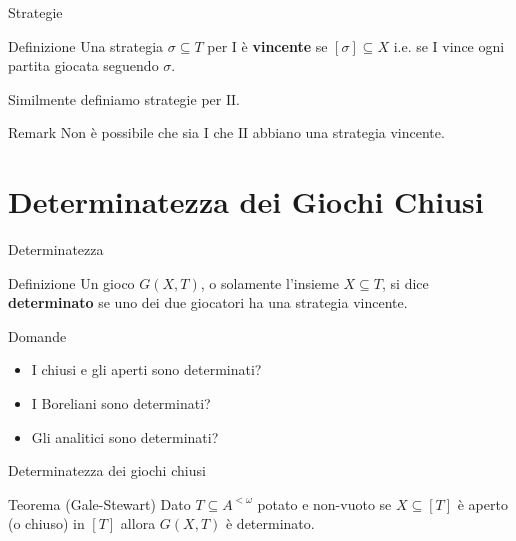 \documentclass[aspectratio=43]{beamer}
\begin{document}
\begin{frame}{Strategie}
  \begin{block}{Definizione}
    Una strategia \(\sigma \subseteq T\) per \(\mathrm{I}\) è \textbf{vincente} se \([\sigma] \subseteq X\) i.e. se \(\mathrm{I}\) vince ogni partita giocata seguendo \(\sigma\).
  \end{block}
  \pause
  Similmente definiamo strategie per \(\mathrm{II}\).
  \pause
  \begin{block}{Remark}
    Non è possibile che sia \(\mathrm{I}\) che \(\mathrm{II}\) abbiano una strategia vincente.
  \end{block}
\end{frame}

\section{Determinatezza dei Giochi Chiusi}

\begin{frame}{Determinatezza}
  \begin{block}{Definizione}
    Un gioco \(G(X, T)\), o solamente l'insieme \(X \subseteq T\), si dice \textbf{determinato} se uno dei due giocatori ha una strategia vincente.
  \end{block}
  \pause
  \begin{block}{Domande}
    \begin{itemize}
    \item I chiusi e gli aperti sono determinati?
    \item I Boreliani sono determinati?
    \item Gli analitici sono determinati?
    \end{itemize}
  \end{block}
\end{frame}

\begin{frame}{Determinatezza dei giochi chiusi}
  \begin{block}{Teorema (Gale-Stewart)}
    Dato \(T \subseteq A^{<\omega}\) potato e non-vuoto se \(X \subseteq [T]\) è aperto (o chiuso) in \([T]\) allora \(G(X, T)\) è determinato.
  \end{block}
\end{frame}
\end{document}
